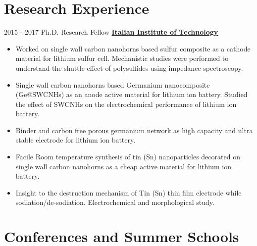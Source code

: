 \documentclass[letterpaper]{twentysecondcv} %
\begin{document}
\section{Research Experience}
\begin{twenty}
	\twentyitem
    	{2015 - 2017}
        {Ph.D. Research Fellow}
        {\href{https://www.iit.it/}{\textbf{Italian Institute of Technology}}}
        {}
        {
        {\begin{itemize}
        \item Worked on single wall carbon nanohorns based sulfur composite as a cathode material for lithium sulfur cell. Mechanistic studies were performed to understand the shuttle effect of polysulfides using impedance spectroscopy.
        \item Single wall carbon nanohorns based Germanium nanocomposite (Ge@SWCNHs) as an anode active material for lithium ion battery. Studied the effect of SWCNHs on the electrochemical performance of lithium ion battery.
        \item Binder and carbon free porous germanium network as high capacity and ultra stable electrode for lithium ion battery.
        \item Facile Room temperature synthesis of tin (Sn) nanoparticles decorated on single wall carbon nanohorns as a cheap active material for lithium ion battery.
        \item Insight to the destruction mechanism of Tin (Sn) thin film electrode while sodiation/de-sodiation. Electrochemical and morphological study.

    \end{itemize}}
        }
\end{twenty}


\section{Conferences and Summer Schools}
\end{document}
